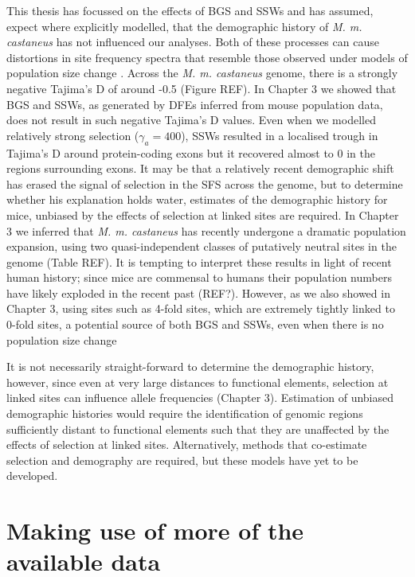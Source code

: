 	This thesis has focussed on the effects of BGS and SSWs and has assumed, expect where explicitly modelled, that the demographic history of \textit{M. m. castaneus} has not influenced our analyses. Both of these processes can cause distortions in site frequency spectra that resemble those observed under models of population size change \citep{RN149, RN242,RN241}. Across the \textit{M. m. castaneus} genome, there is a strongly negative Tajima's D of around -0.5 (Figure REF). In Chapter 3 we showed that BGS and SSWs, as generated by DFEs inferred from mouse population data, does not result in  such negative Tajima's D values. Even when we modelled relatively strong selection ($\gamma_a = 400$), SSWs resulted in a localised trough in Tajima's D around protein-coding exons but it recovered almost to 0 in the regions surrounding exons. It may be that a relatively recent demographic shift has erased the signal of selection in the SFS across the genome, but to determine whether his explanation holds water, estimates of the demographic history for mice, unbiased by the effects of selection at linked sites are required. In Chapter 3 we inferred that \textit{M. m. castaneus} has recently undergone a dramatic population expansion, using two quasi-independent classes of putatively neutral sites in the genome (Table REF). It is tempting to interpret these results in light of recent human history; since mice are commensal to humans their population numbers have likely exploded in the recent past (REF?). However, as we also showed in Chapter 3, using sites such as 4-fold sites, which are extremely tightly linked to 0-fold sites, a potential source of both BGS and SSWs, even when there is no population size change 
	
It is not necessarily straight-forward to determine the demographic history, however, since even at very large distances to functional elements, selection at linked sites can influence allele frequencies (Chapter 3). Estimation of unbiased demographic histories would require the identification of genomic regions sufficiently distant to functional elements such that they are unaffected by the effects of selection at linked sites. Alternatively, methods that co-estimate selection and demography are required, but these models have yet to be developed.

\section{Making use of more of the available data}

